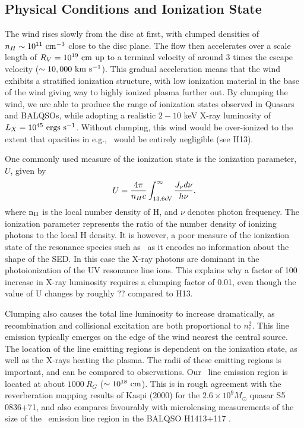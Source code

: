 \documentclass[preprint, a4paper, 11pt]{aastex}
\begin{document}
\subsection{Physical Conditions and Ionization State}

The wind rises slowly from the disc at first, with clumped densities
of $n_H \sim 10^{11}~\rm{cm^{-3}}$ close to the disc plane.
The flow then accelerates over a scale length of $R_V=10^{19}~\rm{cm}$
up to a terminal velocity of around $3$ times the escape velocity 
($\sim10,000~\rm{km~s^{-1}}$). This gradual acceleration means that
the wind exhibits a stratified ionization structure, with low ionization material
in the base of the wind giving way to highly ionized plasma further out.
By clumping the wind, we are able to produce the range of ionization states observed
in Quasars and BALQSOs, while adopting a realistic $2-10$ keV X-ray luminosity
of $L_{X}=10^{45}~\rm{ergs~s^{-1}}$. Without clumping, this wind would be over-ionized 
to the extent that opacities in e.g., \civ\ would be entirely negligible (see H13).

One commonly used measure of the ionization state is the ionization parameter, $U$, given by
\begin{equation}
U = \frac{4\pi}{n_H c}\int_{13.6{\rm{eV}}}^{\infty}\frac{{J_{\nu}d\nu}}{h\nu}.
\end{equation}
\noindent where $\rm{n_H}$ is the local number density of H, and $\nu$ denotes photon 
frequency. The ionization parameter represents the ratio of the number density of 
ionizing photons to the local H density. It is however, a poor measure of the 
ionization state of the resonance species such as \civ\ as it encodes no information
about the shape of the SED. In this case the X-ray photons 
are dominant in the photoionization of the UV resonance line ions. 
This explains why a factor of 100 increase in X-ray luminosity requires
a clumping factor of 0.01, even though the value of U changes by roughly ?? compared to 
H13. 

Clumping also causes the total line luminosity to increase dramatically,
as recombination and collisional excitation are both proportional to
$n_e^2$. This line emission typically emerges on the edge of the wind
nearest the central source. The location of the line emitting regions
is dependent on the ionization state, as well as the X-rays heating the plasma.
The radii of these emitting regions is important,
and can be compared to observations. Our \civ\ line emission region 
is located at about $1000~R_G$ ($\sim10^{18}~\rm{cm}$).
This is in rough agreement with the reverberation mapping 
results of Kaspi (2000) for the $2.6\times10^{9} M_\odot$ quasar S5 0836+71,
and also compares favourably with microlensing measurements of the size of the
\civ\ emission line region in the BALQSO H1413+117 \citep{odowd2015}.
\end{document}
